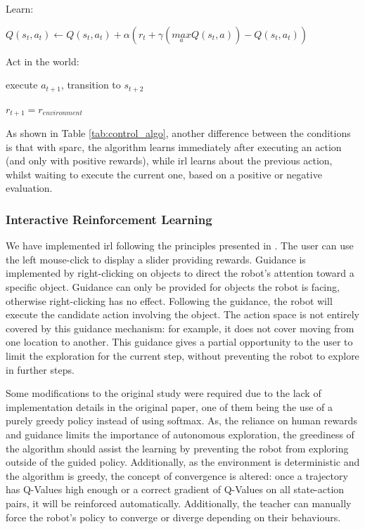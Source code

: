 \begin{table}
\begin{minipage}[t]{0.5\textwidth}
\begin{algorithm}[H]
\begin{minipage}{0.9\linewidth}
{		\nosemic Learn:
		 
		\pushline\dosemic$Q(s_{t},a_{t}) \leftarrow Q(s_{t},a_{t}) + \alpha (r_{t}+\gamma (\underset{a}{max} Q(s_{t},a))-Q(s_{t},a_{t}))$
		
		\popline \nosemic Act in the world:
		
		\pushline\dosemic execute $a_{t+1}$, transition to $s_{t+2}$
		
		\popline$r_{t+1} = r_{environment}$
	}
	\end{minipage}
	\end{algorithm}
\end{minipage}
\label{tab:control_algo}
\end{table}

As shown in Table \ref{tab:control_algo}, another difference between the conditions is that with \gls{sparc}, the algorithm learns immediately after executing an action (and only with positive rewards), while \gls{irl} learns about the previous action, whilst waiting to execute the current one, based on a positive or negative evaluation.

\subsubsection{Interactive Reinforcement Learning}

We have implemented \gls{irl} following the principles presented in \cite{thomaz2008teachable}. The user can use the left mouse-click to display a slider providing rewards. Guidance is implemented by right-clicking on objects to direct the robot's attention toward a specific object. Guidance can only be provided for objects the robot is facing, otherwise right-clicking has no effect. Following the guidance, the robot will execute the candidate action involving the object. The action space is not entirely covered by this guidance mechanism: for example, it does not cover moving from one location to another. This guidance gives a partial opportunity to the user to limit the exploration for the current step, without preventing the robot to explore in further steps.

Some modifications to the original study were required due to the lack of implementation details in the original paper, one of them being the use of a purely greedy policy instead of using softmax. As, the reliance on human rewards and guidance limits the importance of autonomous exploration, the greediness of the algorithm should assist the learning by preventing the robot from exploring outside of the guided policy. Additionally, as the environment is deterministic and the algorithm is greedy, the concept of convergence is altered: once a trajectory has Q-Values high enough or a correct gradient of Q-Values on all state-action pairs, it will be reinforced automatically. Additionally, the teacher can manually force the robot's policy to converge or diverge depending on their behaviours.


